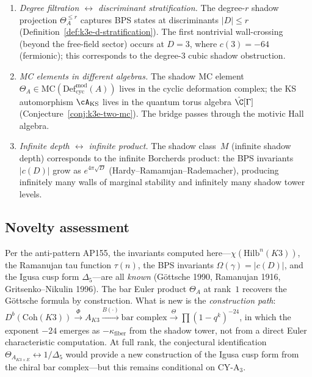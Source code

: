 \begin{enumerate}[label=(\roman*)]
\item \emph{Degree filtration $\leftrightarrow$ discriminant stratification.} The degree-$r$ shadow projection $\Theta_A^{\leq r}$ captures BPS states at discriminants $|D| \leq r$ (Definition~\ref{def:k3e-d-stratification}). The first nontrivial wall-crossing (beyond the free-field sector) occurs at $D = 3$, where $c(3) = -64$ (fermionic); this corresponds to the degree-$3$ cubic shadow obstruction.

\item \emph{MC elements in different algebras.} The shadow MC element $\Theta_A \in \mathrm{MC}(\mathrm{Def}_{\mathrm{cyc}}^{\mathrm{mod}}(A))$ lives in the cyclic deformation complex; the KS automorphism $\cA_{\mathrm{KS}}$ lives in the quantum torus algebra $\hat{\C}[\Gamma]$ (Conjecture~\ref{conj:k3e-two-mc}). The bridge passes through the motivic Hall algebra.

\item \emph{Infinite depth $\leftrightarrow$ infinite product.} The shadow class~$M$ (infinite shadow depth) corresponds to the infinite Borcherds product: the BPS invariants $|c(D)|$ grow as $e^{4\pi\sqrt{D}}$ (Hardy--Ramanujan--Rademacher), producing infinitely many walls of marginal stability and infinitely many shadow tower levels.
\end{enumerate}

\subsection{Novelty assessment}
\label{subsec:k3e-novelty}

Per the anti-pattern AP155, the invariants computed here---$\chi(\mathrm{Hilb}^n(K3))$, the Ramanujan tau function $\tau(n)$, the BPS invariants $\Omega(\gamma) = |c(D)|$, and the Igusa cusp form $\Delta_5$---are all \emph{known} (G\"ottsche 1990, Ramanujan 1916, Gritsenko--Nikulin 1996). The bar Euler product $\Theta_A$ at rank~$1$ recovers the G\"ottsche formula by construction. What is new is the \emph{construction path}: $D^b(\mathrm{Coh}(K3)) \xrightarrow{\Phi} A_{K3} \xrightarrow{B(\cdot)} \text{bar complex} \xrightarrow{\Theta} \prod(1-q^k)^{-24}$, in which the exponent $-24$ emerges as $-\kappa_{\mathrm{fiber}}$ from the shadow tower, not from a direct Euler characteristic computation. At full rank, the conjectural identification $\Theta_{A_{K3 \times E}} \leftrightarrow 1/\Delta_5$ would provide a new construction of the Igusa cusp form from the chiral bar complex---but this remains conditional on CY-A$_3$.

